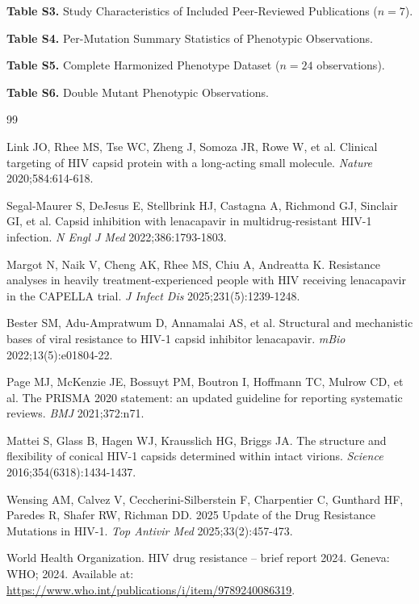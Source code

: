 \documentclass[12pt,a4paper]{article}
\begin{document}
\noindent\textbf{Table S3.} Study Characteristics of Included Peer-Reviewed Publications ($n=7$).
\bigskip

\noindent\textbf{Table S4.} Per-Mutation Summary Statistics of Phenotypic Observations.
\bigskip

\noindent\textbf{Table S5.} Complete Harmonized Phenotype Dataset ($n=24$ observations).
\bigskip

\noindent\textbf{Table S6.} Double Mutant Phenotypic Observations.

\begin{thebibliography}{99}

 Link JO, Rhee MS, Tse WC, Zheng J, Somoza JR, Rowe W, et al. Clinical targeting of HIV capsid protein with a long-acting small molecule. \textit{Nature} 2020;584:614-618.

 Segal-Maurer S, DeJesus E, Stellbrink HJ, Castagna A, Richmond GJ, Sinclair GI, et al. Capsid inhibition with lenacapavir in multidrug-resistant HIV-1 infection. \textit{N Engl J Med} 2022;386:1793-1803.

 Margot N, Naik V, Cheng AK, Rhee MS, Chiu A, Andreatta K. Resistance analyses in heavily treatment-experienced people with HIV receiving lenacapavir in the CAPELLA trial. \textit{J Infect Dis} 2025;231(5):1239-1248.

 Bester SM, Adu-Ampratwum D, Annamalai AS, et al. Structural and mechanistic bases of viral resistance to HIV-1 capsid inhibitor lenacapavir. \textit{mBio} 2022;13(5):e01804-22.

 Page MJ, McKenzie JE, Bossuyt PM, Boutron I, Hoffmann TC, Mulrow CD, et al. The PRISMA 2020 statement: an updated guideline for reporting systematic reviews. \textit{BMJ} 2021;372:n71.

 Mattei S, Glass B, Hagen WJ, Krausslich HG, Briggs JA. The structure and flexibility of conical HIV-1 capsids determined within intact virions. \textit{Science} 2016;354(6318):1434-1437.


 Wensing AM, Calvez V, Ceccherini-Silberstein F, Charpentier C, Gunthard HF, Paredes R, Shafer RW, Richman DD. 2025 Update of the Drug Resistance Mutations in HIV-1. \textit{Top Antivir Med} 2025;33(2):457-473.

 World Health Organization. HIV drug resistance -- brief report 2024. Geneva: WHO; 2024. Available at: \url{https://www.who.int/publications/i/item/9789240086319}.


\end{thebibliography}
\end{document}
